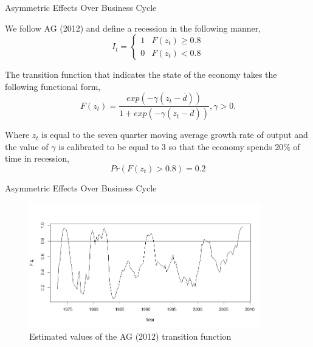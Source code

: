\documentclass[
  10pt,
  ignorenonframetext,
]{beamer}
\begin{document}
\begin{frame}{Asymmetric Effects Over Business Cycle}
\protect\hypertarget{asymmetric-effects-over-business-cycle-2}{}

We follow AG (2012) and define a recession in the following manner,
\[I_{t}=\begin{cases}
1 & F(z_{t})\geq0.8\\
0 & F(z_{t})<0.8
\end{cases}\]

The transition function that indicates the state of the economy takes
the following functional form,
\[F(z_t)= \frac{exp(-\gamma (z_t-\bar{d}))}{1+exp(-\gamma (z_t-\bar{d}))}, \gamma>0.\]

Where \(z_t\) is equal to the seven quarter moving average growth rate
of output and the value of \(\gamma\) is calibrated to be equal to 3 so
that the economy spends 20\% of time in recession,
\[Pr(F(z_t)>0.8)=0.2\]

\end{frame}

\begin{frame}{Asymmetric Effects Over Business Cycle}
\protect\hypertarget{asymmetric-effects-over-business-cycle-3}{}

\begin{figure}
\centering
\includegraphics[width=0.9\textwidth,height=\textheight]{Recession.jpeg}
\caption{Estimated values of the AG (2012) transition function}
\end{figure}

\end{frame}
\end{document}
